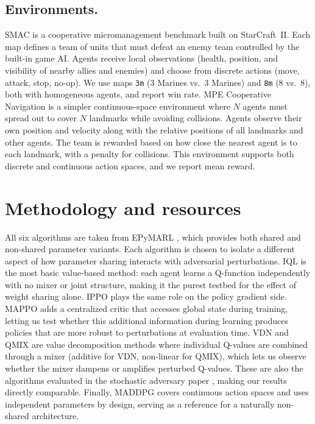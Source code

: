 \documentclass{article}
\begin{document}
\subsection{Environments.}
SMAC \citep{samvelyan2019smac} is a cooperative micromanagement benchmark built on StarCraft~II. Each map defines a team of units that must defeat an enemy team controlled by the built-in game AI. Agents receive local observations (health, position, and visibility of nearby allies and enemies) and choose from discrete actions (move, attack, stop, no-op). We use maps \texttt{3m} (3 Marines vs.\ 3 Marines) and \texttt{8m} (8 vs.\ 8), both with homogeneous agents, and report win rate.
MPE Cooperative Navigation \citep{mordatch2018mpe} is a simpler continuous-space environment where $N$ agents must spread out to cover $N$ landmarks while avoiding collisions. Agents observe their own position and velocity along with the relative positions of all landmarks and other agents. The team is rewarded based on how close the nearest agent is to each landmark, with a penalty for collisions. This environment supports both discrete and continuous action spaces, and we report mean reward.

\section{Methodology and resources}
All six algorithms are taken from EPyMARL \citep{christianos2020epymarl}, which provides both shared and non-shared parameter variants. Each algorithm is chosen to isolate a different aspect of how parameter sharing interacts with adversarial perturbations. IQL is the most basic value-based method: each agent learns a Q-function independently with no mixer or joint structure, making it the purest testbed for the effect of weight sharing alone. IPPO plays the same role on the policy gradient side. MAPPO adds a centralized critic that accesses global state during training, letting us test whether this additional information during learning produces policies that are more robust to perturbations at evaluation time. VDN and QMIX are value decomposition methods where individual Q-values are combined through a mixer (additive for VDN, non-linear for QMIX), which lets us observe whether the mixer dampens or amplifies perturbed Q-values. These are also the algorithms evaluated in the stochastic adversary paper \citep{zhou2025robust}, making our results directly comparable. Finally, MADDPG covers continuous action spaces and uses independent parameters by design, serving as a reference for a naturally non-shared architecture.
\end{document}
